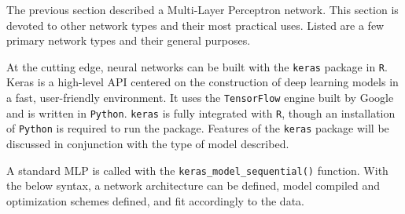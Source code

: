 
The previous section described a Multi-Layer Perceptron network. This
section is devoted to other network types and their most practical uses. Listed are a few primary network types and their general purposes.

At the cutting edge, neural networks can be built with the
\texttt{keras} package in \texttt{R}. Keras is a high-level API centered
on the construction of deep learning models in a fast, user-friendly
environment. It uses the \texttt{TensorFlow} engine built by Google and
is written in \texttt{Python}. \texttt{keras} is fully integrated with
\texttt{R}, though an installation of \texttt{Python} is required to run
the package. Features of the \texttt{keras} package will be discussed in
conjunction with the type of model described.

A standard MLP is called with the \texttt{keras\_model\_sequential()}
function. With the below syntax, a network architecture can be defined,
model compiled and optimization schemes defined, and fit accordingly to
the data.

\begin{Shaded}
\begin{Highlighting}[]
\OtherTok{\textless{}{-}} \NormalTok{()           }
\SpecialCharTok{\%\textgreater{}\%}
      \NormalTok{(} \NormalTok{, } \NormalTok{, } \NormalTok{(}\NormalTok{)) }\SpecialCharTok{\%\textgreater{}\%}
      \NormalTok{(} \NormalTok{, } \NormalTok{) }\SpecialCharTok{\%\textgreater{}\%} 
          \NormalTok{(} \NormalTok{,      }
           \NormalTok{,}
           \NormalTok{) }\SpecialCharTok{\%\textgreater{}\%} 
               \NormalTok{,}
               \NormalTok{,}
               \NormalTok{)}
\end{Highlighting}
\end{Shaded}


